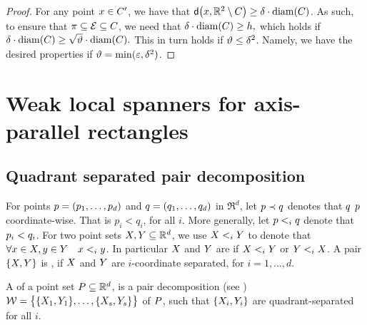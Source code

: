 \documentclass[12pt]{article}%
\begin{document}
\begin{proof}
    For any point $x \in C'$, we have that
    $\dsY{\px}{\Re^2 \setminus \body} \geq \delta \cdot \diamX{\body}$.  As
    such, to ensure that $\pi \subseteq \mathcal{E} \subseteq C$, we need
    that
    \begin{math}
        \delta \cdot \diamX{\body} \geq h,
    \end{math}
    which holds if
    \begin{math}
        \delta \cdot \diamX{\body} \geq \sqrt{\epsA} \cdot  \diameterX{\body}.
    \end{math}
    This in turn holds if $\vartheta \leq \delta^2$. Namely, we have the
    desired properties if $\vartheta = \min( \varepsilon, \delta^2)$.
\end{proof}




\section{Weak local spanners for axis-parallel rectangles}
\subsection{Quadrant separated pair decomposition}

For points $p = (p_1, \ldots, p_d)$ and $q = (q_1, \ldots, q_d)$
in $\Re^d$, let $p \prec q$ denotes that $q$ 
$p$ coordinate-wise. That is $p_i < q_i$, for all $i$. More
generally, let $p <_i q$ denote that $p_i < q_i$. For two
point sets $X, Y \subseteq \mathbb{R}^d$, we use $X <_i Y$ to
denote that $\forall x \in X, y \in Y \quad x <_i y$.
In particular $X$ and $Y$ are 
if $X <_i Y$ or $Y <_i X$. A pair $\{ X, Y\}$ is
, if $X$ and $Y$ are $i$-coordinate
separated, for $i=1,\ldots, d$.

A  of a point set
$P \subseteq \mathbb{R}^d$, is a pair decomposition (see
)
$\mathcal{W} = \bigl\{ \{ X_1, Y_1 \}, \ldots, \{ X_s, Y_s \}
\bigr\}$ of $P$, such that $\{ X_i, Y_i\}$ are
quadrant-separated for all $i$.
\end{document}
